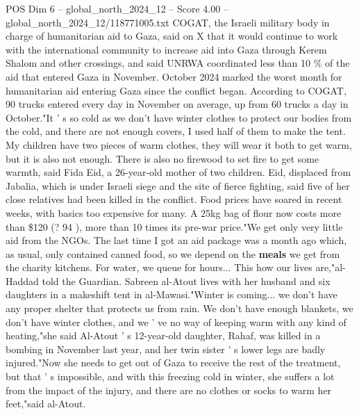 \begin{textsample}{POS Dim 6 – global\_north\_2024\_12 – Score 4.00 – global\_north\_2024\_12/118771005.txt}
COGAT, the Israeli military body in charge of humanitarian aid to Gaza, said on X that it would continue to work with the international community to increase aid into Gaza through Kerem Shalom and other crossings, and said UNRWA coordinated less than 10 \% of the aid that entered Gaza in November.
October 2024 marked the worst month for humanitarian aid entering Gaza since the conflict began.
According to COGAT, 90 trucks entered every day in November on average, up from 60 trucks a day in October."It ' s so cold as we don't have winter clothes to protect our bodies from the cold, and there are not enough covers, I used half of them to make the tent.
My children have two pieces of warm clothes, they will wear it both to get warm, but it is also not enough.
There is also no firewood to set fire to get some warmth, said Fida Eid, a 26-year-old mother of two children.
Eid, displaced from Jabalia, which is under Israeli siege and the site of fierce fighting, said five of her close relatives had been killed in the conflict.
Food prices have soared in recent weeks, with basics too expensive for many.
A 25kg bag of flour now costs more than \$120 (? 94 ), more than 10 times its pre-war price."We get only very little aid from the NGOs.
The last time I got an aid package was a month ago which, as usual, only contained canned food, so we depend on the \textbf{meals} we get from the charity kitchens.
For water, we queue for hours...
This how our lives are,"al-Haddad told the Guardian.
Sabreen al-Atout lives with her husband and six daughters in a makeshift tent in al-Mawasi."Winter is coming... we don't have any proper shelter that protects us from rain.
We don't have enough blankets, we don't have winter clothes, and we ' ve no way of keeping warm with any kind of heating,"she said Al-Atout ' s 12-year-old daughter, Rahaf, was killed in a bombing in November last year, and her twin sister ' s lower legs are badly injured."Now she needs to get out of Gaza to receive the rest of the treatment, but that ' s impossible, and with this freezing cold in winter, she suffers a lot from the impact of the injury, and there are no clothes or socks to warm her feet,"said al-Atout.

\end{textsample}
